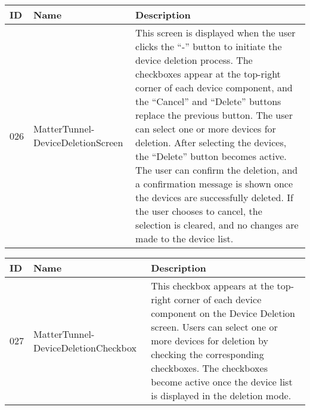 \documentclass[conference]{IEEEtran}
\begin{document}
\begin{enumerate}[itemsep=2ex, parsep=1ex]
\begin{enumerate}[itemsep=2ex, parsep=1ex]
	      	      \begin{table}[h!]
	      	      	\def\arraystretch{1.24} \small
	      	      	\begin{tabular}{|p{1.2cm}|p{2.5cm}|p{4.0cm}|}
	      	      		\hline
	      	      		ID  & Name                              & Description                                                                                                                                                                                                                                                                                                                                                                                                                                                                                                                                                                                                    \\
	      	      		\hline
	      	      		026 & MatterTunnel-DeviceDeletionScreen & This screen is displayed when the user clicks the “-” button to initiate the device deletion process. The checkboxes appear at the top-right corner of each device component, and the “Cancel” and “Delete” buttons replace the previous button. The user can select one or more devices for deletion. After selecting the devices, the “Delete” button becomes active. The user can confirm the deletion, and a confirmation message is shown once the devices are successfully deleted. If the user chooses to cancel, the selection is cleared, and no changes are made to the device list. \\
	      	      		\hline
	      	      	\end{tabular}
	      	      \end{table}
	      	      
	      	      \begin{table}[h!]
	      	      	\def\arraystretch{1.24} \small
	      	      	\begin{tabular}{|p{1.2cm}|p{2.5cm}|p{4.0cm}|}
	      	      		\hline
	      	      		ID  & Name                                & Description                                                                                                                                                                                                                                                                            \\
	      	      		\hline
	      	      		027 & MatterTunnel-DeviceDeletionCheckbox & This checkbox appears at the top-right corner of each device component on the Device Deletion screen. Users can select one or more devices for deletion by checking the corresponding checkboxes. The checkboxes become active once the device list is displayed in the deletion mode. \\
	      	      		\hline
	      	      	\end{tabular}
	      	      \end{table}
	      	      

\end{enumerate}
\end{enumerate}
\end{document}
